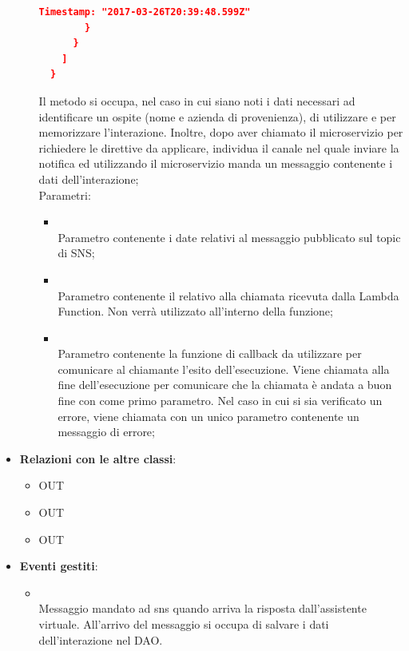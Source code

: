 \begin{itemize}
\begin{itemize}
\begin{lstlisting}[language=json,firstnumber=1]
          Timestamp: "2017-03-26T20:39:48.599Z"
        }
      }
    ]
  }
\end{lstlisting}
		Il metodo si occupa, nel caso in cui siano noti i dati necessari ad identificare un ospite (nome e azienda di provenienza), di utilizzare  e  per memorizzare l'interazione. Inoltre, dopo aver chiamato il microservizio  per richiedere le direttive da applicare, individua il canale nel quale inviare la notifica ed utilizzando il microservizio  manda un messaggio contenente i dati dell'interazione;\\
		Parametri:
		\begin{itemize}
			\item {} \\
			Parametro contenente i date relativi al messaggio pubblicato sul topic di SNS;
			\item {} \\
			Parametro contenente il  relativo alla chiamata ricevuta dalla Lambda Function. Non verrà utilizzato all'interno della funzione;
			\item {} \\
			Parametro contenente la funzione di callback da utilizzare per comunicare al chiamante l'esito dell'esecuzione. Viene chiamata alla fine dell'esecuzione per comunicare che la chiamata è andata a buon fine con  come primo parametro. Nel caso in cui si sia verificato un errore, viene chiamata con un unico parametro contenente un messaggio di errore;
		\end{itemize}
	\end{itemize}
	\item \textbf{Relazioni con le altre classi}:
	\begin{itemize}
		\item OUT \hyperlink{<<interface>> ConversationsDAO_label}{}
		\item OUT \hyperlink{<<interface>> GuestsDAO_label}{}
		\item OUT \hyperlink{SNSEvent_label}{}
	\end{itemize}
	\item \textbf{Eventi gestiti}:
	\begin{itemize}
		\item {} \\ Messaggio mandato ad sns quando arriva la risposta dall'assistente virtuale. All'arrivo del messaggio si occupa di salvare i dati dell'interazione nel DAO.	\end{itemize}
\end{itemize}
\FloatBarrier

